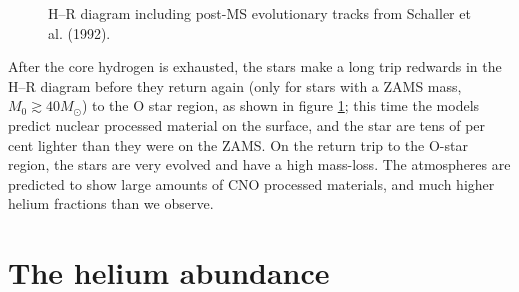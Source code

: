 \begin{figure} %
\epsfxsize=11cm
\setlength{\cen}{(\textwidth / 2) - (\epsfxsize / 2)}
\hspace{\cen}
\caption[H--R diagram including post-MS evolutionary tracks]
{\fcfont H--R diagram including post-MS evolutionary tracks from
Schaller et al. (1992).}
\label{fig:hrd:evol}
\end{figure}   %

After the core hydrogen is exhausted, the stars make a long trip
redwards in the H--R diagram before they return again (only for stars
with a ZAMS mass, $M_0 \gtrsim 40M_\odot$) to the O star
region, as shown in figure \ref{fig:hrd:evol}; this time the models
 predict nuclear processed material on the surface, and the
star are tens of per cent lighter than they were on the ZAMS. On the
return trip to the O-star region, the stars are very evolved and have
a high mass-loss. The atmospheres are predicted to show large amounts
of CNO processed materials, and much higher helium fractions than we observe.


\section{The helium abundance}
\label{sec:helium}

